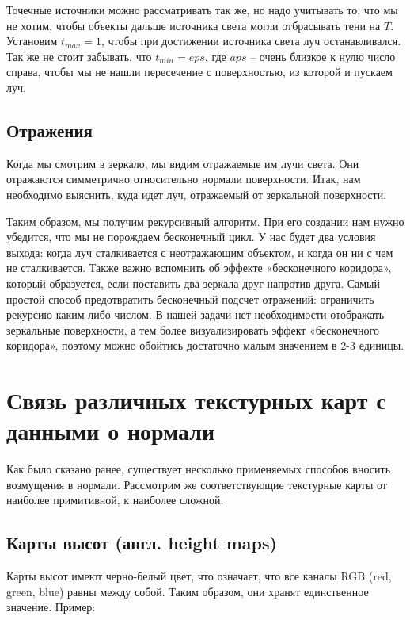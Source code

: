 Точечные источники можно рассматривать так же, но надо учитывать то, что мы не хотим, чтобы объекты дальше источника света могли отбрасывать тени на $T$. Установим $t_{max} = 1$, чтобы при достижении источника света луч останавливался. Так же не стоит забывать, что $t_{min} = eps$, где $aps$ – очень близкое к нулю число справа, чтобы мы не нашли пересечение с поверхностью, из которой и пускаем луч.

\subsection{Отражения}

Когда мы смотрим в зеркало, мы видим отражаемые им лучи света. Они отражаются симметрично относительно нормали поверхности. Итак, нам необходимо выяснить, куда идет луч, отражаемый от зеркальной поверхности.

Таким образом, мы получим рекурсивный алгоритм. При его создании нам нужно убедится, что мы не порождаем бесконечный цикл. У нас будет два условия выхода: когда луч сталкивается с неотражающим объектом, и когда он ни с чем не сталкивается. Также важно вспомнить об эффекте «бесконечного коридора», который образуется, если поставить два зеркала друг напротив друга. Самый простой способ предотвратить бесконечный подсчет отражений: ограничить рекурсию каким-либо числом. В нашей задачи нет необходимости отображать зеркальные поверхности, а тем более визуализировать эффект «бесконечного коридора», поэтому можно обойтись достаточно малым значением в 2-3 единицы.

\section{Связь различных текстурных карт с данными о нормали}

Как было сказано ранее, существует несколько применяемых способов
вносить возмущения в нормали. Рассмотрим же соответствующие текстурные
карты от наиболее примитивной, к наиболее сложной.

\subsection{Карты высот (англ. height maps)}

Карты высот имеют черно-белый цвет, что означает, что все каналы RGB (red, green, blue) равны между собой. Таким образом, они хранят единственное значение. Пример:

